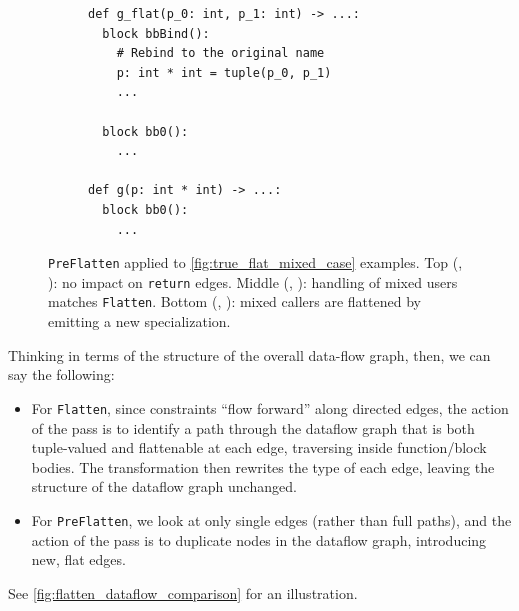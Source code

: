 \begin{figure}[htbp]
\begin{subfigure}[t]{0.48\textwidth}
\begin{verbatim}
def g_flat(p_0: int, p_1: int) -> ...:
  block bbBind():
    # Rebind to the original name
    p: int * int = tuple(p_0, p_1)
    ...

  block bb0():
    ...

def g(p: int * int) -> ...:
  block bb0():
    ...
\end{verbatim}
  \end{subfigure}
  \caption{\texttt{PreFlatten} applied to \cref{fig:true_flat_mixed_case} examples.
Top
(, ):
no impact on \texttt{return} edges.
Middle
(, ):
handling of mixed users matches \texttt{Flatten}.
Bottom (, ): mixed callers are flattened by emitting a new specialization.}
  \label{fig:pre_flatten_mixed_case}
\end{figure}

Thinking in terms of the structure of the overall data-flow graph, then, we can
say the following:

\begin{itemize}
\item For \texttt{Flatten}, since constraints ``flow forward''
along directed edges, the action of the pass is to identify a path through the
dataflow graph that is both tuple-valued and flattenable at each edge,
traversing inside function/block bodies. The transformation then rewrites the
type of each edge, leaving the structure of the dataflow graph unchanged.

\item For \texttt{PreFlatten}, we look at only single edges (rather than full paths),
and the action of the pass is to duplicate nodes in the dataflow graph, introducing
new, flat edges.

\end{itemize}

See \cref{fig:flatten_dataflow_comparison} for an illustration.

